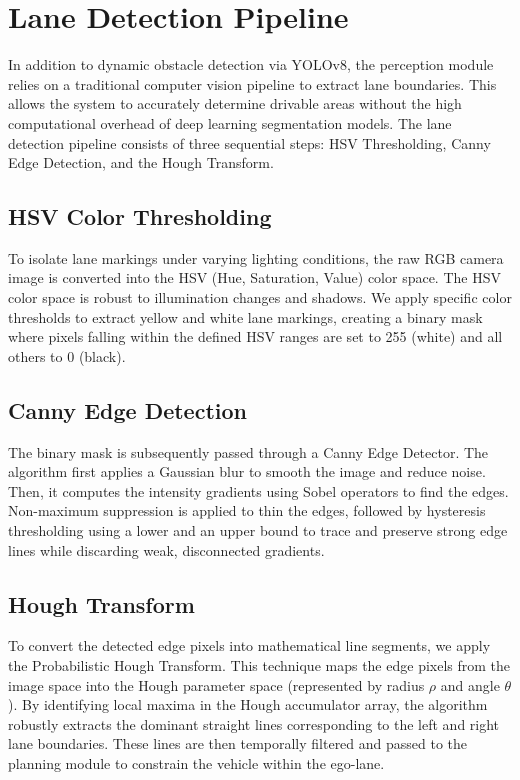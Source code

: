 \documentclass[11pt,a4paper]{report}
\begin{document}
\section{Lane Detection Pipeline}
\label{sec:lane_detection}
In addition to dynamic obstacle detection via YOLOv8, the perception module relies on a traditional computer vision pipeline to extract lane boundaries. This allows the system to accurately determine drivable areas without the high computational overhead of deep learning segmentation models. The lane detection pipeline consists of three sequential steps: HSV Thresholding, Canny Edge Detection, and the Hough Transform.

\subsection{HSV Color Thresholding}
To isolate lane markings under varying lighting conditions, the raw RGB camera image is converted into the HSV (Hue, Saturation, Value) color space. The HSV color space is robust to illumination changes and shadows. We apply specific color thresholds to extract yellow and white lane markings, creating a binary mask where pixels falling within the defined HSV ranges are set to 255 (white) and all others to 0 (black).

\subsection{Canny Edge Detection}
The binary mask is subsequently passed through a Canny Edge Detector. The algorithm first applies a Gaussian blur to smooth the image and reduce noise. Then, it computes the intensity gradients using Sobel operators to find the edges. Non-maximum suppression is applied to thin the edges, followed by hysteresis thresholding using a lower and an upper bound to trace and preserve strong edge lines while discarding weak, disconnected gradients.

\subsection{Hough Transform}
To convert the detected edge pixels into mathematical line segments, we apply the Probabilistic Hough Transform. This technique maps the edge pixels from the image space into the Hough parameter space (represented by radius $\rho$ and angle $\theta$). By identifying local maxima in the Hough accumulator array, the algorithm robustly extracts the dominant straight lines corresponding to the left and right lane boundaries. These lines are then temporally filtered and passed to the planning module to constrain the vehicle within the ego-lane.
\end{document}
